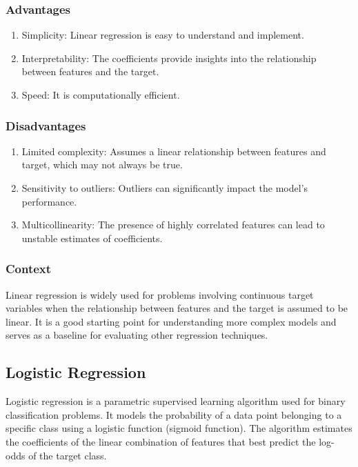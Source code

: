 \documentclass[12pt]{article}
\begin{document}
\subsubsection{Advantages}
\begin{enumerate}
\item Simplicity: Linear regression is easy to understand and implement.
\item Interpretability: The coefficients provide insights into the relationship between features and the target.
\item Speed: It is computationally efficient.
\end{enumerate}

\subsubsection{Disadvantages}
\begin{enumerate}
\item Limited complexity: Assumes a linear relationship between features and target, which may not always be true.
\item Sensitivity to outliers: Outliers can significantly impact the model's performance.
\item Multicollinearity: The presence of highly correlated features can lead to unstable estimates of coefficients.
\end{enumerate}

\subsubsection{Context}
Linear regression is widely used for problems involving continuous target variables when the relationship between features and the target is assumed to be linear. It is a good starting point for understanding more complex models and serves as a baseline for evaluating other regression techniques.




\subsection{Logistic Regression}

Logistic regression is a parametric supervised learning algorithm used for binary classification problems. It models the probability of a data point belonging to a specific class using a logistic function (sigmoid function). The algorithm estimates the coefficients of the linear combination of features that best predict the log-odds of the target class.
\end{document}

